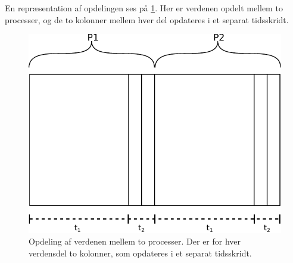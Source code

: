 En repræsentation af opdelingen ses på \cref{fig:wator}. Her er verdenen 
opdelt mellem to processer, og de to kolonner mellem hver del opdateres i et 
separat tidsskridt.  

\begin{figure} 
 \begin{center}
  \includegraphics[scale=0.75]{images/wator}
  \caption{Opdeling af verdenen mellem to processer. Der er for hver verdensdel 
  to kolonner, som opdateres i et separat tidsskridt.}
  \label{fig:wator}
  \end{center}
\end{figure}


